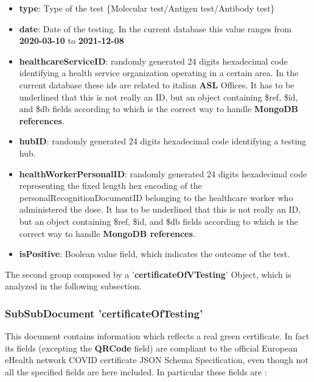 \documentclass{article}[IEEEtran]
\begin{document}
    \begin{itemize}
    
        \item \textbf{type}: Type of the test \{Molecular test/Antigen test/Antibody test\}
        
        \item \textbf{date}: Date of the testing. In the current database this value ranges from \textbf{2020-03-10} to \textbf{2021-12-08}
        \item \textbf{healthcareServiceID}: randomly generated 24 digits hexadecimal code identifying a health service organization operating in a certain area. In the current database these ids are related to italian \textbf{ASL} Offices. It has to be underlined that this is not really an ID, but an object containing \$ref, \$id, and \$db fields according to which is the correct way to handle \textbf{MongoDB references}\cite{mongodbreferences}.
        
        \item \textbf{hubID}: randomly generated 24 digits hexadecimal code identifying a testing hub.
        \item \textbf{healthWorkerPersonalID}: randomly generated 24 digits hexadecimal code representing the fixed length hex encoding of the personalRecognitionDocumentID belonging to the healthcare worker who administered the dose. It has to be underlined that this is not really an ID, but an object containing \$ref, \$id, and \$db fields according to which is the correct way to handle \textbf{MongoDB references}\cite{mongodbreferences}.
        
        \item \textbf{isPositive}: Boolean value field, which indicates the outcome of the test.
        
    \end{itemize}

The second group composed by a '\textbf{certificateOfVTesting}' Object, which is analyzed in the following subsection.

\subsubsection{SubSubDocument 'certificateOfTesting'}

This document contains information which reflects a real green certificate. In fact its fields (excepting the \textbf{QRCode} field) are compliant to the official European eHealth network COVID certificate JSON Schema Specification, even though not all the specified fields are here included. 
In particular these fields are :
\end{document}
